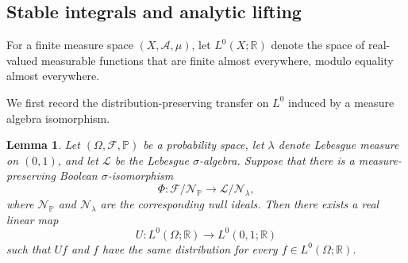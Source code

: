 \documentclass[11pt, reqno]{amsart}
\newtheorem{lemma}[theorem]{Lemma}
\theoremstyle{definition}
\theoremstyle{remark}
\newcommand{\R}{\mathbb{R}}
\begin{document}
\subsection{Stable integrals and analytic lifting}
\label{subsec:stable-lift}

For a finite measure space \((X,\mathcal A,\mu)\), let
\(L^0(X;\R)\) denote the space of real-valued measurable functions
that are finite almost everywhere, modulo equality almost everywhere.

We first record the distribution-preserving transfer on \(L^0\)
induced by a measure algebra isomorphism.

\begin{lemma}
\label{lem:L0-transfer}
Let \((\Omega,\mathcal F,\mathbb P)\) be a probability space, let
\(\lambda\) denote Lebesgue measure on \((0,1)\), and let
\(\mathcal L\) be the Lebesgue \(\sigma\)-algebra. Suppose that there
is a measure-preserving Boolean \(\sigma\)-isomorphism
\[
        \Phi:
        \mathcal F/\mathcal N_{\mathbb P}
        \longrightarrow
        \mathcal L/\mathcal N_\lambda,
\]
where \(\mathcal N_{\mathbb P}\) and \(\mathcal N_\lambda\) are the
corresponding null ideals. Then there exists a real linear map
\[
        U:L^0(\Omega;\R)\longrightarrow L^0(0,1;\R)
\]
such that \(Uf\) and \(f\) have the same distribution for every
\(f\in L^0(\Omega;\R)\).
\end{lemma}
\end{document}
